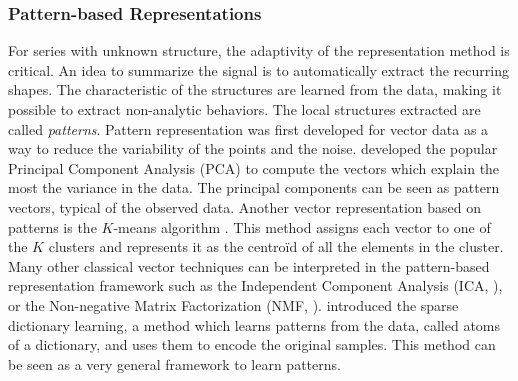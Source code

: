 \documentclass[../thesis.tex]{subfiles}
\begin{document}


\subsubsection{Pattern-based Representations}
\label{ssub:intro:rpz:patterns}

For series with unknown structure, the adaptivity of the representation method is critical. An idea to summarize the signal is to automatically extract the recurring shapes. The characteristic of the structures are learned from the data, making it possible to extract non-analytic behaviors. The local structures extracted are called \emph{patterns}. Pattern representation was first developed for	vector data as a way to reduce the variability of the points and the noise. \citet{hotelling1933analysis} developed the popular Principal Component Analysis (PCA) to compute the vectors which explain the most the variance in the data. The principal components can be seen as pattern vectors, typical of the observed data. Another vector representation based on patterns is the $K$-means algorithm \citep{Macqueen1967}. This method assigns each vector to one of the $K$ clusters and represents it as the centroïd of all the elements in the cluster. Many other classical vector techniques can be interpreted in the pattern-based representation framework such as the Independent Component Analysis (ICA, \citealt{Naik2011}), or the Non-negative Matrix Factorization (NMF, \citealt{Gillis2011}). \citet{Olshausen1997} introduced the sparse dictionary learning, a method which learns patterns from the data, called atoms of a dictionary, and uses them to encode the original samples. This method can be seen as a very general framework to learn patterns.
\end{document}
